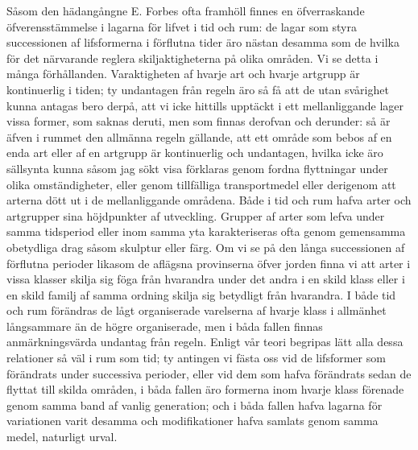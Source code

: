 Såsom den hädangångne E. Forbes ofta framhöll finnes en öfverraskande öfverensstämmelse i lagarna för lifvet i tid och rum: de lagar som styra successionen af lifsformerna i förflutna tider äro nästan desamma som de hvilka för det närvarande reglera skiljaktigheterna på olika områden. Vi se detta i många förhållanden. Varaktigheten af hvarje art och hvarje artgrupp är kontinuerlig i tiden; ty undantagen från regeln äro så få att de utan svårighet kunna antagas bero derpå, att vi icke hittills upptäckt i ett mellanliggande lager vissa former, som saknas deruti, men som finnas derofvan och derunder: så är äfven i rummet den allmänna regeln gällande, att ett område som bebos af en enda art eller af en artgrupp är kontinuerlig och undantagen, hvilka icke äro sällsynta kunna såsom jag sökt visa förklaras genom fordna flyttningar under olika omständigheter, eller genom tillfälliga transportmedel eller derigenom att arterna dött ut i de mellanliggande områdena. Både i tid och rum hafva arter och artgrupper sina höjdpunkter af utveckling. Grupper af arter som lefva under samma tidsperiod eller inom samma yta karakteriseras ofta genom gemensamma obetydliga drag såsom skulptur eller färg. Om vi se på den långa successionen af förflutna perioder likasom de aflägsna provinserna öfver jorden finna vi att arter i vissa klasser skilja sig föga från hvarandra under det andra i en skild klass eller i en skild familj af samma ordning skilja sig betydligt från hvarandra. I både tid och rum förändras de lågt organiserade varelserna af hvarje klass i allmänhet långsammare än de högre organiserade, men i båda fallen finnas anmärkningsvärda undantag från regeln. Enligt vår teori begripas lätt alla dessa relationer så väl i rum som tid; ty antingen vi fästa oss vid de lifsformer som förändrats under successiva perioder, eller vid dem som hafva förändrats sedan de flyttat till skilda områden, i båda fallen äro formerna inom hvarje klass förenade genom samma band af vanlig generation; och i båda fallen hafva lagarna för variationen varit desamma och modifikationer hafva samlats genom samma medel, naturligt urval.


